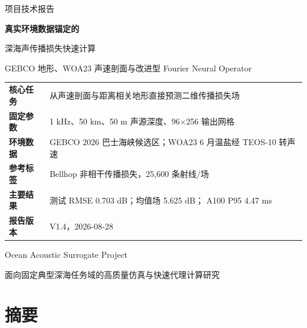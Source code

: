 \documentclass[UTF8,11pt]{ctexart}
\newcommand{\BestRMSE}{0.703}
\newcommand{\GlobalBaseline}{5.625}
\newcommand{\GpuPninetyfive}{4.47}
\begin{document}
\begin{titlepage}
\vspace*{2.0cm}
{\sffamily\color{Blue}\Large 项目技术报告}\par
\vspace{0.75cm}
{\sffamily\bfseries\color{Navy}\fontsize{26}{34}\selectfont
真实环境数据锚定的\par
深海声传播损失快速计算}\par
\vspace{0.65cm}
{\sffamily\color{Dark}\Large
GEBCO 地形、WOA23 声速剖面与改进型 Fourier Neural Operator}\par

\vspace{1.45cm}
\begin{summarybox}
\centering
\begin{tabular}{L{3.4cm}L{8.0cm}}
\textbf{核心任务} & 从声速剖面与距离相关地形直接预测二维传播损失场 \\
\textbf{固定参数} & 1 kHz、50 km、50 m 声源深度、96$\times$256 输出网格 \\
\textbf{环境数据} & GEBCO 2026 巴士海峡候选区；WOA23 6 月温盐经 TEOS-10 转声速 \\
\textbf{参考标签} & Bellhop 非相干传播损失，25,600 条射线/场 \\
\textbf{主要结果} & 测试 RMSE \BestRMSE{} dB；均值场 \GlobalBaseline{} dB；
  A100 P95 \GpuPninetyfive{} ms \\
\textbf{报告版本} & V1.4，2026-08-28 \\
\end{tabular}
\end{summarybox}
\vfill
{\sffamily\color{Navy}\Large Ocean Acoustic Surrogate Project}\par
\vspace{0.3cm}
{\color{Dark}面向固定典型深海任务域的高质量仿真与快速代理计算研究}\par
\vspace{1.0cm}
\end{titlepage}

\section*{摘\quad 要}
\end{document}
